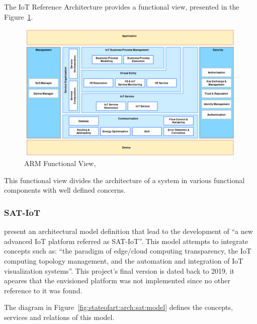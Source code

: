 The IoT Reference Architecture provides a functional view, presented in the Figure~\ref{fig:stateofart:arch:iota:functional}.

\begin{figure}[H]
    \centering
    \includegraphics[scale=0.5]{
        assets/figures/arm-functional-view.png
    }
    \caption[ARM Functional View]{ARM Functional View, \cite{iot-arm-functional}}
    \label{fig:stateofart:arch:iota:functional}
\end{figure}

This functional view divides the architecture of a system in various functional components with well defined concerns.

\subsubsection{SAT-IoT}
\label{subsubsec:stateofart:arch:sat}

\cite{8767282} present an architectural model definition that lead to the development of ``a new advanced \gls{IoT} platform referred as SAT-IoT''. This model attempts to integrate concepts such as:  ``the paradigm of edge/cloud computing transparency, the IoT computing topology management, and the automation and integration of IoT visualization systems''. This project's final version is dated back to 2019, it apeares that the envisioned platform was not implemented since no other reference to it was found.

The diagram in Figure~\ref{fig:stateofart:arch:sat:model} defines the concepts, services and relations of this model.

